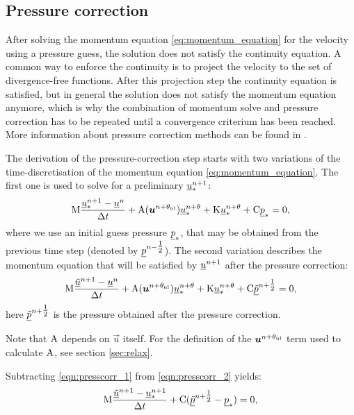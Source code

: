 \subsection{Pressure correction}\label{sec:pressure_correction}

After solving the momentum equation \eqref{eq:momentum_equation} for the
velocity using a pressure guess, the solution does not satisfy the
continuity equation. A common way to enforce the continuity is to project
the velocity to the set of divergence-free functions. After this projection
step the continuity equation is satisfied, but in general the solution does
not satisfy the momentum equation anymore, which is why the combination of
momentum solve and pressure correction has to be repeated until a
convergence criterium has been reached.
More information about pressure correction methods can be
found in \cite{gresho1988}.

The derivation of the pressure-correction step starts with two
variations of the time-discretisation of the
momentum equation \eqref{eq:momentum_equation}. The first
one is used to solve for a preliminary $\underline{u}_*^{n+1}$:
\begin{equation}\label{eqn:presscorr_1}
\mathrm{M}  \frac{{\underline{u}_*^{n+1}-\underline{u}^{n}}}{\Delta t}
    +\mathrm{A}({\mbox{\boldmath$u$}}^{n+\theta_{\mathrm{nl}}})\underline{u}_*^{n+\theta}+\mathrm{K}\underline{u}_*^{n+\theta}
    +\mathrm{C} \underline{p}_*
    =0,
\end{equation}
where we use an initial guess pressure $\underline{p}_*$, that may
be obtained from the previous time step (denoted by
$\underline{p}^{n-\tfrac 12}$). %
The second variation
describes the momentum equation that will be satisfied by
$\underline{u}^{n+1}$ after the pressure correction:
\begin{equation}\label{eqn:presscorr_2}
\mathrm{M}  \frac{{\underline{\tilde u}^{n+1}-\underline{u}^{n}}}{\Delta t}
    +\mathrm{A}({\mbox{\boldmath$u$}}^{n+\theta_{\mathrm{nl}}})\underline{u}_*^{n+\theta}+\mathrm{K}\underline{u}_*^{n+\theta}
    +\mathrm{C} \underline{\tilde p}^{n+\tfrac 12}
    =0,
\end{equation}
here $\underline{\tilde p}^{n+\tfrac 12}$ is the pressure
obtained after the pressure correction.

Note that $\mathrm{A}$ depends on $\vec{u}$ itself. For the definition of the
${\mbox{\boldmath$u$}}^{n+\theta_{\mathrm{nl}}}$ term used to calculate $\mathrm{A}$, see section \ref{sec:relax}.

Subtracting \eqref{eqn:presscorr_1} from \eqref{eqn:presscorr_2} yields:
\begin{equation}\label{eqn:presscorr_substract}
\mathrm{M}  \frac{{\underline{\tilde u}^{n+1}-\underline{u}_*^{n+1}}}{\Delta t}
    + \mathrm{C} ( \underline{\tilde p}^{n+\tfrac 12} - \underline{p}_*)
    =0,
\end{equation}

